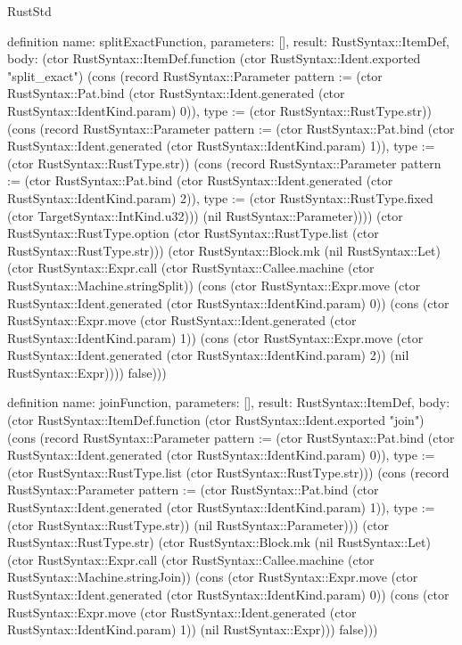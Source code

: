 \begin{lexlean}{RustStd}
\begin{semanticmodule}
definition{
  name: splitExactFunction,
  parameters: [],
  result: RustSyntax::ItemDef,
  body: (ctor RustSyntax::ItemDef.function (ctor RustSyntax::Ident.exported "split_exact") (cons (record RustSyntax::Parameter {pattern := (ctor RustSyntax::Pat.bind (ctor RustSyntax::Ident.generated (ctor RustSyntax::IdentKind.param) 0)), type := (ctor RustSyntax::RustType.str)}) (cons (record RustSyntax::Parameter {pattern := (ctor RustSyntax::Pat.bind (ctor RustSyntax::Ident.generated (ctor RustSyntax::IdentKind.param) 1)), type := (ctor RustSyntax::RustType.str)}) (cons (record RustSyntax::Parameter {pattern := (ctor RustSyntax::Pat.bind (ctor RustSyntax::Ident.generated (ctor RustSyntax::IdentKind.param) 2)), type := (ctor RustSyntax::RustType.fixed (ctor TargetSyntax::IntKind.u32))}) (nil RustSyntax::Parameter)))) (ctor RustSyntax::RustType.option (ctor RustSyntax::RustType.list (ctor RustSyntax::RustType.str))) (ctor RustSyntax::Block.mk (nil RustSyntax::Let) (ctor RustSyntax::Expr.call (ctor RustSyntax::Callee.machine (ctor RustSyntax::Machine.stringSplit)) (cons (ctor RustSyntax::Expr.move (ctor RustSyntax::Ident.generated (ctor RustSyntax::IdentKind.param) 0)) (cons (ctor RustSyntax::Expr.move (ctor RustSyntax::Ident.generated (ctor RustSyntax::IdentKind.param) 1)) (cons (ctor RustSyntax::Expr.move (ctor RustSyntax::Ident.generated (ctor RustSyntax::IdentKind.param) 2)) (nil RustSyntax::Expr)))) false)))
}

definition{
  name: joinFunction,
  parameters: [],
  result: RustSyntax::ItemDef,
  body: (ctor RustSyntax::ItemDef.function (ctor RustSyntax::Ident.exported "join") (cons (record RustSyntax::Parameter {pattern := (ctor RustSyntax::Pat.bind (ctor RustSyntax::Ident.generated (ctor RustSyntax::IdentKind.param) 0)), type := (ctor RustSyntax::RustType.list (ctor RustSyntax::RustType.str))}) (cons (record RustSyntax::Parameter {pattern := (ctor RustSyntax::Pat.bind (ctor RustSyntax::Ident.generated (ctor RustSyntax::IdentKind.param) 1)), type := (ctor RustSyntax::RustType.str)}) (nil RustSyntax::Parameter))) (ctor RustSyntax::RustType.str) (ctor RustSyntax::Block.mk (nil RustSyntax::Let) (ctor RustSyntax::Expr.call (ctor RustSyntax::Callee.machine (ctor RustSyntax::Machine.stringJoin)) (cons (ctor RustSyntax::Expr.move (ctor RustSyntax::Ident.generated (ctor RustSyntax::IdentKind.param) 0)) (cons (ctor RustSyntax::Expr.move (ctor RustSyntax::Ident.generated (ctor RustSyntax::IdentKind.param) 1)) (nil RustSyntax::Expr))) false)))
}


\end{semanticmodule}
\end{lexlean}
